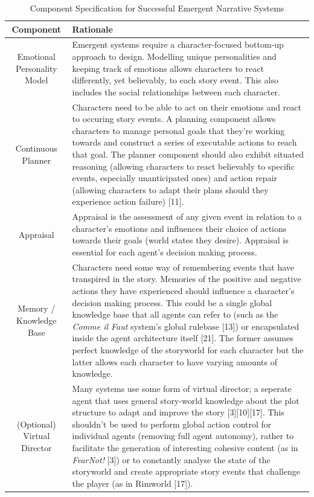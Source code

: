\documentclass{sig-alternate-05-2015}
\begin{document}
\begin{table}[!b]
\centering
\caption{Component Specification for Successful Emergent Narrative Systems}
    \begin{tabular}{| c | p{13cm} |}
    \hline
    \textbf{Component} & \textbf{Rationale} \\ \hline
    Emotional Personality Model & Emergent systems require a character-focused bottom-up approach to design. Modelling unique personalities and keeping track of emotions allows characters to react differently, yet believably, to each story event. This also includes the social relationships between each character. \\ \hline
    Continuous Planner & Characters need to be able to act on their emotions and react to occuring story events. A planning component allows characters to manage personal goals that they're working towards and construct a series of executable actions to reach that goal. The planner component should also exhibit situated reasoning (allowing characters to react believably to specific events, especially unanticipated ones) and action repair (allowing characters to adapt their plans should they experience action failure) [11]. \\ \hline
    Appraisal & Appraisal is the assessment of any given event in relation to a character's emotions and influences their choice of actions towards their goals (world states they desire). Appraisal is essential for each agent's decision making process. \\ \hline
    Memory / Knowledge Base & Characters need some way of remembering events that have transpired in the story. Memories of the positive and negative actions they have experienced should influence a character's decision making process. This could be a single global knowledge base that all agents can refer to (such as the \textit{Comme il Faut} system's global rulebase [13]) or encapsulated inside the agent architecture itself [21]. The former assumes perfect knowledge of the storyworld for each character but the latter allows each character to have varying amounts of knowledge. \\ \hline
    (Optional) Virtual Director & Many systems use some form of virtual director; a seperate agent that uses general story-world knowledge about the plot structure to adapt and improve the story [3][10][17]. This shouldn't be used to perform global action control for individual agents (removing full agent autonomy), rather to facilitate the generation of interesting cohesive content (as in \textit{FearNot!} [3]) or to constantly analyse the state of the storyworld and create appropriate story events that challenge the player (as in Rimworld [17]). \\ \hline
    \end{tabular}
\end{table}
\end{document}
